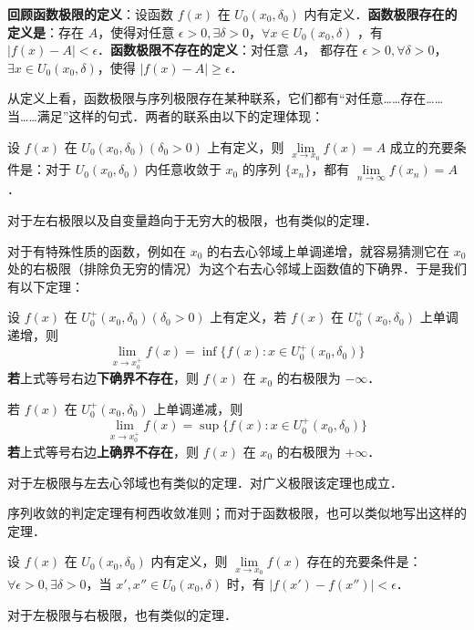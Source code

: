 \textbf{回顾函数极限的定义}：设函数 $f(x)$ 在 $U_0(x_0,\delta_0)$ 内有定义．\textbf{函数极限存在的定义是}：存在 $A$，使得对任意 $\epsilon >0, \exists \delta>0$，$\forall x\in U_0(x_0,\delta)$ ，有 $|f(x)-A|<\epsilon$．\textbf{函数极限不存在的定义}：对任意 $A$， 都存在 $\epsilon>0,\forall \delta>0$，$\exists x\in U_0(x_0,\delta)$，使得 $|f(x)-A|\ge \epsilon$．

从定义上看，函数极限与序列极限存在某种联系，它们都有“对任意……存在……当……满足”这样的句式．两者的联系由以下的定理体现：

\begin{theorem}{}
设 $f(x)$ 在 $U_0(x_0,\delta_0)(\delta_0>0)$ 上有定义，则 $\lim\limits_{x\rightarrow x_0}f(x)=A$ 成立的充要条件是：对于 $U_0(x_0,\delta_0)$ 内任意收敛于 $x_0$ 的序列 $\{x_n\}$，都有 $\lim\limits_{n\rightarrow \infty}f(x_n)=A$．

对于左右极限以及自变量趋向于无穷大的极限，也有类似的定理．
\end{theorem}

对于有特殊性质的函数，例如在 $x_0$ 的右去心邻域上单调递增，就容易猜测它在 $x_0$ 处的右极限（排除负无穷的情况）为这个右去心邻域上函数值的下确界．于是我们有以下定理：
\begin{theorem}{}
设 $f(x)$ 在 $U_0^+(x_0,\delta_0)(\delta_0>0)$ 上有定义，若 $f(x)$ 在  $U_0^+(x_0,\delta_0)$ 上单调递增，则
\begin{equation}
  \lim\limits_{x\rightarrow x_0^+}f(x)=\inf\{f(x):x\in U_0^+(x_0,\delta_0)\}
\end{equation}
\textbf{若}上式等号右边\textbf{下确界不存在}，则 $f(x)$ 在 $x_0$ 的右极限为 $-\infty$．

若 $f(x)$ 在  $U_0^+(x_0,\delta_0)$ 上单调递减，则
\begin{equation}
\lim\limits_{x\rightarrow x_0^+}f(x)=\sup\{f(x):x\in U_0^+(x_0,\delta_0)\}
\end{equation}
\textbf{若}上式等号右边\textbf{上确界不存在}，则 $f(x)$ 在 $x_0$ 的右极限为 $+\infty$．

对于左极限与左去心邻域也有类似的定理．对广义极限该定理也成立．
\end{theorem}

序列收敛的判定定理有柯西收敛准则；而对于函数极限，也可以类似地写出这样的定理．
\begin{theorem}{}
设 $f(x)$ 在 $U_0(x_0,\delta_0)$ 内有定义，则 $\lim\limits_{x\rightarrow x_0}f(x)$ 存在的充要条件是： $\forall \epsilon>0,\exists\delta>0$，当 $x',x''\in U_0(x_0,\delta)$ 时，有 $|f(x')-f(x'')|<\epsilon$．

对于左极限与右极限，也有类似的定理．
\end{theorem}

